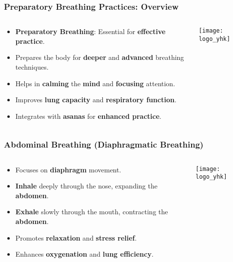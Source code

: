 \begin{frame}[fragile]\frametitle{Preparatory Breathing Practices: Overview}
\begin{columns}
    \begin{column}[T]{0.5\linewidth}
      \begin{itemize}
        \item \textbf{Preparatory Breathing}: Essential for \textbf{effective practice}.
        \item Prepares the body for \textbf{deeper} and \textbf{advanced} breathing techniques.
        \item Helps in \textbf{calming} the \textbf{mind} and \textbf{focusing} attention.
        \item Improves \textbf{lung capacity} and \textbf{respiratory function}.
        \item Integrates with \textbf{asanas} for \textbf{enhanced practice}.
      \end{itemize}
    \end{column}
    \begin{column}[T]{0.5\linewidth}
        \begin{center}
        \texttt{[image: logo\_yhk]}
        \end{center}	
    \end{column}
\end{columns}
\end{frame}

\begin{frame}[fragile]\frametitle{Abdominal Breathing (Diaphragmatic Breathing)}
\begin{columns}
    \begin{column}[T]{0.5\linewidth}
      \begin{itemize}
        \item Focuses on \textbf{diaphragm} movement.
        \item \textbf{Inhale} deeply through the nose, expanding the \textbf{abdomen}.
        \item \textbf{Exhale} slowly through the mouth, contracting the \textbf{abdomen}.
        \item Promotes \textbf{relaxation} and \textbf{stress relief}.
        \item Enhances \textbf{oxygenation} and \textbf{lung efficiency}.
      \end{itemize}
    \end{column}
    \begin{column}[T]{0.5\linewidth}
        \begin{center}
        \texttt{[image: logo\_yhk]}
        \end{center}	
    \end{column}
\end{columns}
\end{frame}

